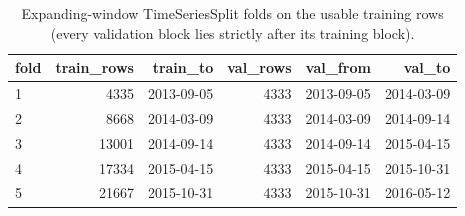 \begin{table}[t]
\centering
\small
\caption{Expanding-window TimeSeriesSplit folds on the usable training rows (every validation block lies strictly after its training block).}
\label{tab:table_S05_cv_folds}
\begin{tabular}{lrrrrr}
\toprule
fold & train\_rows & train\_to & val\_rows & val\_from & val\_to \\
\midrule
1 & 4335 & 2013-09-05 & 4333 & 2013-09-05 & 2014-03-09 \\
2 & 8668 & 2014-03-09 & 4333 & 2014-03-09 & 2014-09-14 \\
3 & 13001 & 2014-09-14 & 4333 & 2014-09-14 & 2015-04-15 \\
4 & 17334 & 2015-04-15 & 4333 & 2015-04-15 & 2015-10-31 \\
5 & 21667 & 2015-10-31 & 4333 & 2015-10-31 & 2016-05-12 \\
\bottomrule
\end{tabular}
\end{table}
